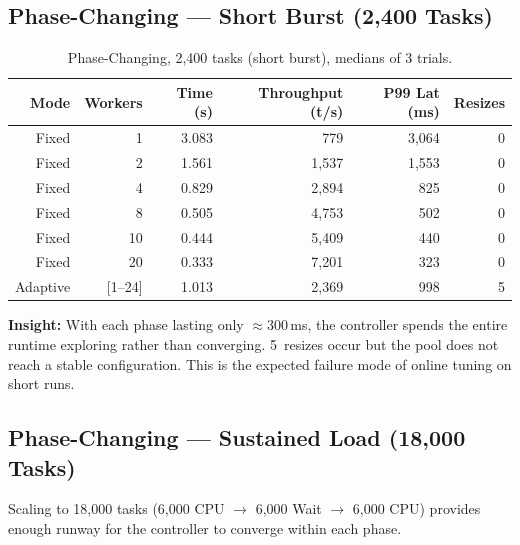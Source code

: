 \documentclass[12pt,a4paper]{article}
\begin{document}
\subsection{Phase-Changing --- Short Burst (2,400 Tasks)}
\label{sec:phase_short}

\begin{table}[H]
\centering
\caption{Phase-Changing, 2,400 tasks (short burst), medians of 3 trials.}
\begin{tabular}{rrrrrr}
\toprule
\textbf{Mode} & \textbf{Workers} & \textbf{Time (s)}
  & \textbf{Throughput (t/s)} & \textbf{P99 Lat (ms)} & \textbf{Resizes} \\
\midrule
Fixed &  1 & 3.083 &   779 & 3,064 & 0 \\
Fixed &  2 & 1.561 & 1,537 & 1,553 & 0 \\
Fixed &  4 & 0.829 & 2,894 &   825 & 0 \\
Fixed &  8 & 0.505 & 4,753 &   502 & 0 \\
Fixed & 10 & 0.444 & 5,409 &   440 & 0 \\
Fixed & 20 & 0.333 & 7,201 &   323 & 0 \\
\rowcolor{rowblue}
Adaptive & [1--24] & 1.013 & 2,369 & 998 & 5 \\
\bottomrule
\end{tabular}
\label{tab:phase_short}
\end{table}

\textbf{Insight:}
With each phase lasting only $\approx 300$\,ms, the controller spends
the entire runtime exploring rather than converging.
5~resizes occur but the pool does not reach a stable configuration.
This is the expected failure mode of online tuning on short runs.

\subsection{Phase-Changing --- Sustained Load (18,000 Tasks)}
\label{sec:phase_sustained}

Scaling to 18,000 tasks (6,000 CPU $\to$ 6,000 Wait $\to$ 6,000 CPU)
provides enough runway for the controller to converge within each phase.
\end{document}
